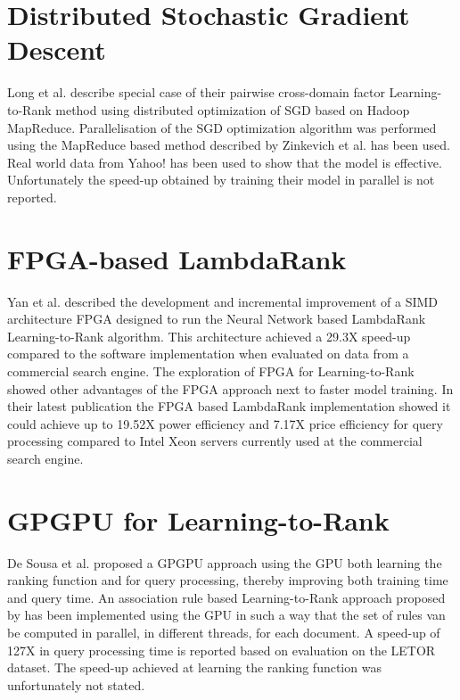 \section{Distributed Stochastic Gradient Descent}
Long et al. \cite{Long2012} describe special case of their pairwise cross-domain factor Learning-to-Rank method using distributed optimization of \ac{SGD} based on Hadoop MapReduce. Parallelisation of the \ac{SGD} optimization algorithm was performed using the MapReduce based method described by  Zinkevich et al. \cite{Zinkevich2010} has been used. Real world data from Yahoo! has been used to show that the model is effective. Unfortunately the speed-up obtained by training their model in parallel is not reported.
\section{FPGA-based LambdaRank}
Yan et al. \cite{Yan2009,Yan2010,Yan2011,Yan2012} described the development and incremental improvement of a \ac{SIMD} architecture \ac{FPGA} designed to run the Neural Network based LambdaRank Learning-to-Rank algorithm. This architecture achieved a 29.3X speed-up compared to the software implementation when evaluated on data from a commercial search engine. The exploration of \ac{FPGA} for Learning-to-Rank showed other advantages of the \ac{FPGA} approach next to faster model training. In their latest publication \cite{Yan2012} the \ac{FPGA} based LambdaRank implementation showed it could achieve up to 19.52X power efficiency and 7.17X price efficiency for query processing compared to Intel Xeon servers currently used at the commercial search engine.
\section{GPGPU for Learning-to-Rank}
De Sousa et al. \cite{DeSousa2012} proposed a \ac{GPGPU} approach using the \ac{GPU} both learning the ranking function and for query processing, thereby improving both training time and query time. An association rule based Learning-to-Rank approach proposed by \cite{Veloso2008} has been implemented using the \ac{GPU} in such a way that the set of rules van be computed in parallel, in different threads, for each document. A speed-up of 127X in query processing time is reported based on evaluation on the LETOR dataset. The speed-up achieved at learning the ranking function was unfortunately not stated.
